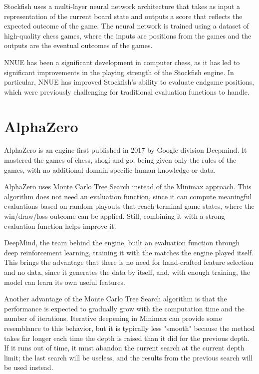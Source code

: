 Stockfish uses a multi-layer neural network architecture that takes as input a representation of the current board state and outputs a score that reflects the expected outcome of the game. The neural network is trained using a dataset of high-quality chess games, where the inputs are positions from the games and the outputs are the eventual outcomes of the games.

NNUE has been a significant development in computer chess, as it has led to significant improvements in the playing strength of the Stockfish engine. In particular, NNUE has improved Stockfish's ability to evaluate endgame positions, which were previously challenging for traditional evaluation functions to handle.

\section{AlphaZero}
\label{sec:ch3sec4}

AlphaZero is an engine first published in 2017 by Google division Deepmind. It mastered the games of chess, shogi and go, being given only the rules of the games, with no additional domain-specific human knowledge or data.

AlphaZero uses Monte Carlo Tree Search instead of the Minimax approach. This algorithm does not need an evaluation function, since it can compute meaningful evaluations based on random playouts that reach terminal game states, where the win/draw/loss outcome can be applied. Still, combining it with a strong evaluation function helps improve it.

DeepMind, the team behind the engine, built an evaluation function through deep reinforcement learning, training it with the matches the engine played itself. This brings the advantage that there is no need for hand-crafted feature selection and no data, since it generates the data by itself, and, with enough training, the model can learn its own useful features.

Another advantage of the Monte Carlo Tree Search algorithm is that the performance is expected to gradually grow with the computation time and the number of iterations. Iterative deepening in Minimax can provide some resemblance to this behavior, but it is typically less "smooth" because the method takes far longer each time the depth is raised than it did for the previous depth. If it runs out of time, it must abandon the current search at the current depth limit; the last search will be useless, and the results from the previous search will be used instead.

